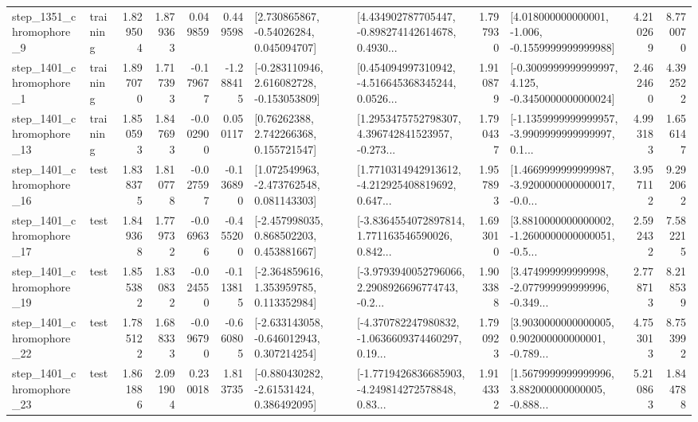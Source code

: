 \begin{tabular}{llrrrrllrlrr}
  step\_1351\_chromophore\_9 &  training &      1.829504 &    1.879363 &      0.049859 &  0.449598 &     [2.730865867, -0.54026284, 0.045094707] &  [4.434902787705447, -0.898274142614678, 0.4930... &       1.797930 &   [4.018000000000001, -1.006, -0.1559999999999988] &            4.210269 &          8.770070 \\
  step\_1401\_chromophore\_1 &  training &      1.897070 &    1.717393 &     -0.179677 & -1.288415 &   [-0.283110946, 2.616082728, -0.153053809] &  [0.454094997310942, -4.516645368345244, 0.0526... &       1.910879 &  [-0.3009999999999997, 4.125, -0.3450000000000024] &            2.462460 &          4.392522 \\
 step\_1401\_chromophore\_13 &  training &      1.850593 &    1.847693 &     -0.002900 &  0.050117 &      [0.76262388, 2.742266368, 0.155721547] &  [1.2953475752798307, 4.396742841523957, -0.273... &       1.790437 &  [-1.1359999999999957, -3.9909999999999997, 0.1... &            4.993183 &          1.656147 \\
 step\_1401\_chromophore\_16 &      test &      1.838375 &    1.810778 &     -0.027597 & -0.136890 &    [1.072549963, -2.473762548, 0.081143303] &  [1.7710314942913612, -4.212925408819692, 0.647... &       1.957893 &  [1.4669999999999987, -3.9200000000000017, -0.0... &            3.957112 &          9.292062 \\
 step\_1401\_chromophore\_17 &      test &      1.849368 &    1.779732 &     -0.069636 & -0.455200 &    [-2.457998035, 0.868502203, 0.453881667] &  [-3.8364554072897814, 1.771163546590026, 0.842... &       1.693010 &  [3.8810000000000002, -1.2600000000000051, -0.5... &            2.592432 &          7.582215 \\
 step\_1401\_chromophore\_19 &      test &      1.855382 &    1.830832 &     -0.024550 & -0.113815 &    [-2.364859616, 1.353959785, 0.113352984] &  [-3.9793940052796066, 2.2908926696774743, -0.2... &       1.903388 &  [3.474999999999998, -2.077999999999996, -0.349... &            2.778713 &          8.218539 \\
 step\_1401\_chromophore\_22 &      test &      1.785122 &    1.688333 &     -0.096790 & -0.660805 &   [-2.633143058, -0.646012943, 0.307214254] &  [-4.370782247980832, -1.0636609374460297, 0.19... &       1.790923 &  [3.9030000000000005, 0.902000000000001, -0.789... &            4.753013 &          8.753992 \\
 step\_1401\_chromophore\_23 &      test &      1.861886 &    2.091904 &      0.230018 &  1.813735 &    [-0.880430282, -2.61531424, 0.386492095] &  [-1.7719426836685903, -4.249814272578848, 0.83... &       1.914332 &  [1.5679999999999996, 3.882000000000005, -0.888... &            5.210863 &          1.844788 \\

\end{tabular}
